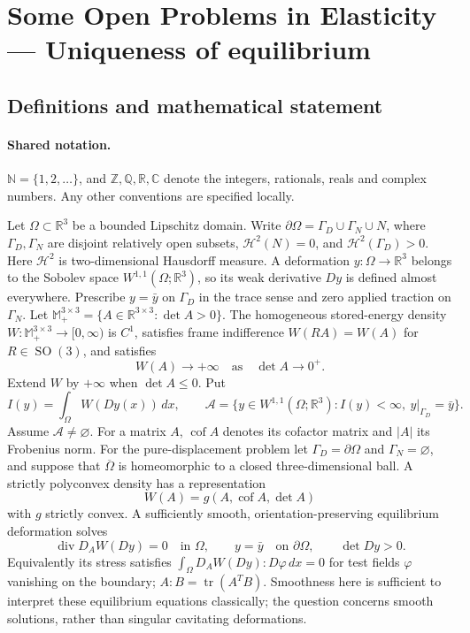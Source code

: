 \documentclass[11pt]{book}
\begin{document}
\section{Some Open Problems in Elasticity — Uniqueness of equilibrium}\label{statement}

\subsection{Definitions and mathematical statement}

\paragraph{Shared notation.}$\mathbb N=\{1,2,\ldots\}$, and $\mathbb Z,\mathbb Q,\mathbb R,\mathbb C$ denote the integers, rationals, reals and complex numbers. Any other conventions are specified locally.


Let $\Omega\subset\mathbb R^3$ be a bounded Lipschitz domain. Write $\partial\Omega=\Gamma_D\cup\Gamma_N\cup N$, where $\Gamma_D,\Gamma_N$ are disjoint relatively open subsets, $\mathcal H^2(N)=0$, and $\mathcal H^2(\Gamma_D)>0$. Here $\mathcal H^2$ is two-dimensional Hausdorff measure. A deformation $y:\Omega\to\mathbb R^3$ belongs to the Sobolev space $W^{1,1}(\Omega;\mathbb R^3)$, so its weak derivative $Dy$ is defined almost everywhere. Prescribe $y=\bar y$ on $\Gamma_D$ in the trace sense and zero applied traction on $\Gamma_N$.
Let $\mathbb M_+^{3\times3}=\{A\in\mathbb R^{3\times3}:\det A>0\}$. The homogeneous stored-energy density $W:\mathbb M_+^{3\times3}\to[0,\infty)$ is $C^1$, satisfies frame indifference $W(RA)=W(A)$ for $R\in\operatorname{SO}(3)$, and satisfies
\[
 W(A)\longrightarrow+\infty\quad\text{as}\quad\det A\longrightarrow0^+.
\]
Extend $W$ by $+\infty$ when $\det A\le0$. Put
\[
 I(y)=\int_\Omega W(Dy(x))\,dx,\qquad
 \mathcal A=\{y\in W^{1,1}(\Omega;\mathbb R^3):I(y)<\infty,\ y|_{\Gamma_D}=\bar y\}.
\]
Assume $\mathcal A\ne\varnothing$. For a matrix $A$, $\operatorname{cof}A$ denotes its cofactor matrix and $|A|$ its Frobenius norm.
For the pure-displacement problem let $\Gamma_D=\partial\Omega$ and $\Gamma_N=\varnothing$, and suppose that $\overline\Omega$ is homeomorphic to a closed three-dimensional ball. A strictly polyconvex density has a representation
\[W(A)=g(A,\operatorname{cof}A,\det A)\]
with $g$ strictly convex. A sufficiently smooth, orientation-preserving equilibrium deformation solves
\[
 \operatorname{div}D_AW(Dy)=0\quad\text{in }\Omega,
 \qquad y=\bar y\quad\text{on }\partial\Omega,
 \qquad\det Dy>0.
\]
Equivalently its stress satisfies $\int_\Omega D_AW(Dy):D\varphi\,dx=0$ for test fields $\varphi$ vanishing on the boundary; $A:B=\operatorname{tr}(A^TB)$. Smoothness here is sufficient to interpret these equilibrium equations classically; the question concerns smooth solutions, rather than singular cavitating deformations.
\end{document}
